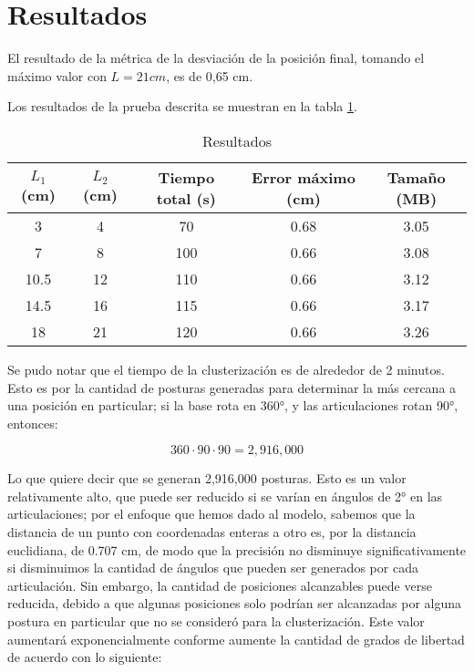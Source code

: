 \section{Resultados}

El resultado de la métrica de la desviación de la posición final, tomando el máximo valor con $L = 21 cm$, es de 0,65 cm.

Los resultados de la prueba descrita se muestran en la tabla \ref{tab:Resultados}.

\begin{table}[ht]
	\centering
	\begin{tabular}{|c|c|c|c|c|}
		\hline
		\textbf{$L_1$ (cm)} & \textbf{$L_2$ (cm)} & \textbf{Tiempo total (s)} & \textbf{Error máximo (cm)} & \textbf{Tamaño (MB)} \\
		\hline
		3 & 4 & 70 & 0.68 & 3.05 \\
		7 & 8 & 100 & 0.66 & 3.08 \\
		10.5 & 12 & 110 & 0.66 & 3.12 \\
		14.5 & 16 & 115 & 0.66 & 3.17 \\
		18 & 21 & 120 & 0.66 & 3.26 \\
		\hline
	\end{tabular}
	\caption{Resultados}
	\label{tab:Resultados}
\end{table}

Se pudo notar que el tiempo de la clusterización es de alrededor de 2 minutos. Esto es por la cantidad de posturas generadas para determinar la más cercana a una posición en particular; si la base rota en 360°, y las articulaciones rotan 90°, entonces:

\begin{equation}
	360 \cdot 90 \cdot 90 = 2,916,000
\end{equation}

Lo que quiere decir que se generan 2,916,000 posturas. Esto es un valor relativamente alto, que puede ser reducido si se varían en ángulos de 2° en las articulaciones; por el enfoque que hemos dado al modelo, sabemos que la distancia de un punto con coordenadas enteras a otro es, por la distancia euclidiana, de 0.707 cm, de modo que la precisión no disminuye significativamente si disminuimos la cantidad de ángulos que pueden ser generados por cada articulación. Sin embargo, la cantidad de posiciones alcanzables puede verse reducida, debido a que algunas posiciones solo podrían ser alcanzadas por alguna postura en particular que no se consideró para la clusterización. Este valor aumentará exponencialmente conforme aumente la cantidad de grados de libertad de acuerdo con lo siguiente:

